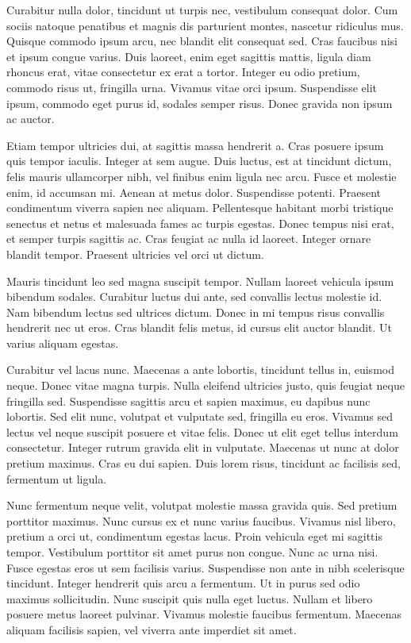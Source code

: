 \documentclass[10pt,twocolumn,letterpaper]{article}
\begin{document}
Curabitur nulla dolor, tincidunt ut turpis nec, vestibulum consequat dolor. Cum sociis natoque penatibus et magnis dis parturient montes, nascetur ridiculus mus. Quisque commodo ipsum arcu, nec blandit elit consequat sed. Cras faucibus nisi et ipsum congue varius. Duis laoreet, enim eget sagittis mattis, ligula diam rhoncus erat, vitae consectetur ex erat a tortor. Integer eu odio pretium, commodo risus ut, fringilla urna. Vivamus vitae orci ipsum. Suspendisse elit ipsum, commodo eget purus id, sodales semper risus. Donec gravida non ipsum ac auctor.

Etiam tempor ultricies dui, at sagittis massa hendrerit a. Cras posuere ipsum quis tempor iaculis. Integer at sem augue. Duis luctus, est at tincidunt dictum, felis mauris ullamcorper nibh, vel finibus enim ligula nec arcu. Fusce et molestie enim, id accumsan mi. Aenean at metus dolor. Suspendisse potenti. Praesent condimentum viverra sapien nec aliquam. Pellentesque habitant morbi tristique senectus et netus et malesuada fames ac turpis egestas. Donec tempus nisi erat, et semper turpis sagittis ac. Cras feugiat ac nulla id laoreet. Integer ornare blandit tempor. Praesent ultricies vel orci ut dictum.

Mauris tincidunt leo sed magna suscipit tempor. Nullam laoreet vehicula ipsum bibendum sodales. Curabitur luctus dui ante, sed convallis lectus molestie id. Nam bibendum lectus sed ultrices dictum. Donec in mi tempus risus convallis hendrerit nec ut eros. Cras blandit felis metus, id cursus elit auctor blandit. Ut varius aliquam egestas.

Curabitur vel lacus nunc. Maecenas a ante lobortis, tincidunt tellus in, euismod neque. Donec vitae magna turpis. Nulla eleifend ultricies justo, quis feugiat neque fringilla sed. Suspendisse sagittis arcu et sapien maximus, eu dapibus nunc lobortis. Sed elit nunc, volutpat et vulputate sed, fringilla eu eros. Vivamus sed lectus vel neque suscipit posuere et vitae felis. Donec ut elit eget tellus interdum consectetur. Integer rutrum gravida elit in vulputate. Maecenas ut nunc at dolor pretium maximus. Cras eu dui sapien. Duis lorem risus, tincidunt ac facilisis sed, fermentum ut ligula.

Nunc fermentum neque velit, volutpat molestie massa gravida quis. Sed pretium porttitor maximus. Nunc cursus ex et nunc varius faucibus. Vivamus nisl libero, pretium a orci ut, condimentum egestas lacus. Proin vehicula eget mi sagittis tempor. Vestibulum porttitor sit amet purus non congue. Nunc ac urna nisi. Fusce egestas eros ut sem facilisis varius. Suspendisse non ante in nibh scelerisque tincidunt. Integer hendrerit quis arcu a fermentum. Ut in purus sed odio maximus sollicitudin. Nunc suscipit quis nulla eget luctus. Nullam et libero posuere metus laoreet pulvinar. Vivamus molestie faucibus fermentum. Maecenas aliquam facilisis sapien, vel viverra ante imperdiet sit amet. 
\end{document}
